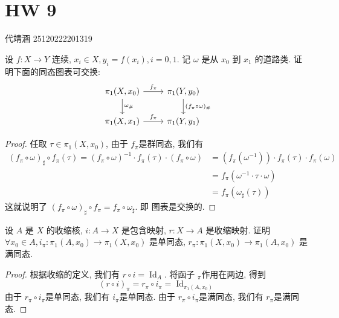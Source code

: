 \documentclass[../main.tex]{subfiles}
\begin{document}
\ifSubfilesClassLoaded{

    
    \setcounter{chapter}{8}
}{}

\chapter{ HW 9 }
代靖涵 25120222201319

\begin{exercise}{}{}
设 $f:X\rightarrow Y$ 连续, $x_{i}\in X, y_{i}=f(x_{i}), i=0,1$. 记 $\omega$ 是从 $x_{0}$ 到 $x_{1}$ 的道路类. 证明下面的同态图表可交换:
\[\begin{tikzcd}
\pi_1(X, x_0) \arrow[r, "f_ \pi "] \arrow[d, "\omega_\#"] & \pi_1(Y, y_0) \arrow[d, "(f _{ \pi }\circ \omega)_\#"] \\
\pi_1(X, x_1) \arrow[r, "f_ \pi "] & \pi_1(Y, y_1)
\end{tikzcd}\]
\end{exercise}

\begin{proof}
    任取 \(  \tau \in  \pi _1 \left( X,x_0 \right)   \), 由于 \(  f_{ \pi }  \)是群同态, 我们有 \[
   \begin{aligned}
    \left( f_{ \pi }\circ  \omega  \right)_{\sharp }\circ f_{ \pi }\left( \tau  \right)= \left( f_{ \pi }\circ  \omega  \right)^{-1}\cdot   f_{ \pi }\left( \tau  \right)    \cdot \left( f_{ \pi }\circ  \omega  \right) & = \left( f_{ \pi }\left(  \omega ^{-1}  \right)  \right)\cdot  f_{ \pi }\left( \tau  \right)\cdot  f_{ \pi }\left(  \omega  \right)\\ 
     &= f_{ \pi }\left(   \omega ^{-1} \cdot \tau \cdot  \omega   \right)\\ 
      &=  f_{ \pi }\left(  \omega _{\sharp }\left( \tau  \right)  \right)  
   \end{aligned}   
    \] 这就说明了 \(  \left( f_{ \pi }\circ  \omega  \right)_{\sharp }\circ f_{ \pi }= f_{ \pi }\circ  \omega _{\sharp }   \). 即 图表是交换的. 
\end{proof}

\begin{exercise}{}{}
设 $A$ 是 $X$ 的收缩核, $i:A\rightarrow X$ 是包含映射, $r:X\rightarrow A$ 是收缩映射. 证明 $\forall x_{0}\in A, i_{ \pi }:\pi_{1}(A,x_{0})\rightarrow\pi_{1}(X,x_{0})$ 是单同态, $r_{ \pi }:\pi_{1}(X,x_{0})\rightarrow\pi_{1}(A,x_{0})$ 是满同态.
\end{exercise}

\begin{proof}
    根据收缩的定义, 我们有 \(  r\circ i= \operatorname{Id}_{A}  \). 将函子 \(   {}_{ \pi }  \)作用在两边, 得到 \[
    \left( r\circ i \right)_{ \pi }= r_{ \pi }\circ i_{ \pi }= \operatorname{Id}_{ \pi _1 \left( A,x_0 \right) } 
    \]  由于 \(  r_{ \pi }\circ i_{ \pi }  \)是单同态, 我们有 \(  i_{ \pi }  \)是单同态. 由于 \(  r_{ \pi }  \circ i_{ \pi }\)是满同态, 我们有 \(  r_{ \pi }  \)是满同态.    
\end{proof}
\end{document}
